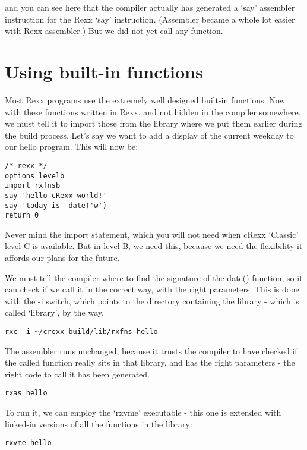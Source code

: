 and you can see here that the compiler actually has generated a `say'
assembler instruction for the Rexx `say' instruction. (Assembler became
a whole lot easier with Rexx assembler.) But we did not yet call any
function.

\hypertarget{using-built-in-functions}{%
\section{Using built-in functions}\label{using-built-in-functions}}

Most Rexx programs use the extremely well designed built-in functions.
Now with these functions written in Rexx, and not hidden in the compiler
somewhere, we must tell it to import those from the library where we put
them earlier during the build process. Let's say we want to add a
display of the current weekday to our hello program. This will now be:

\begin{verbatim}
/* rexx */
options levelb
import rxfnsb
say 'hello cRexx world!'
say 'today is' date('w')
return 0
\end{verbatim}

Never mind the import statement, which you will not need when cRexx
`Classic' level C is available. But in level B, we need this, because we
need the flexibility it affords our plans for the future.

We must tell the compiler where to find the signature of the date()
function, so it can check if we call it in the correct way, with the
right parameters. This is done with the -i switch, which points to the
directory containing the library - which is called `library', by the
way.

\begin{verbatim}
rxc -i ~/crexx-build/lib/rxfns hello
\end{verbatim}

The assembler runs unchanged, because it trusts the compiler to have
checked if the called function really sits in that library, and has the
right parameters - the right code to call it has been generated.

\begin{verbatim}
rxas hello
\end{verbatim}

To run it, we can employ the `rxvme' executable - this one is extended
with linked-in versions of all the functions in the library:

\begin{verbatim}
rxvme hello
\end{verbatim}

